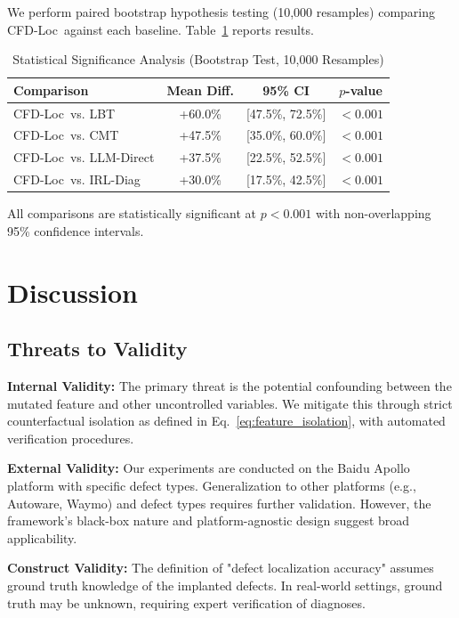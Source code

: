 \documentclass[conference]{IEEEtran}
\theoremstyle{plain}
\newcommand{\methodname}{CFD-Loc}
\begin{document}
We perform paired bootstrap hypothesis testing (10,000 resamples) comparing \methodname\ against each baseline. Table~\ref{tab:stats} reports results.

\begin{table}[h]
\centering
\caption{Statistical Significance Analysis (Bootstrap Test, 10,000 Resamples)}
\label{tab:stats}
\begin{tabular}{lccc}
\toprule
\textbf{Comparison} & \textbf{Mean Diff.} & \textbf{95\% CI} & \textbf{$p$-value} \\
\midrule
\methodname\ vs. LBT & +60.0\% & [47.5\%, 72.5\%] & $<0.001$ \\
\methodname\ vs. CMT & +47.5\% & [35.0\%, 60.0\%] & $<0.001$ \\
\methodname\ vs. LLM-Direct & +37.5\% & [22.5\%, 52.5\%] & $<0.001$ \\
\methodname\ vs. IRL-Diag & +30.0\% & [17.5\%, 42.5\%] & $<0.001$ \\
\bottomrule
\end{tabular}
\end{table}

All comparisons are statistically significant at $p < 0.001$ with non-overlapping 95\% confidence intervals.

\section{Discussion}
\label{sec:discussion}

\subsection{Threats to Validity}

\textbf{Internal Validity:} The primary threat is the potential confounding between the mutated feature and other uncontrolled variables. We mitigate this through strict counterfactual isolation as defined in Eq.~\ref{eq:feature_isolation}, with automated verification procedures.

\textbf{External Validity:} Our experiments are conducted on the Baidu Apollo platform with specific defect types. Generalization to other platforms (e.g., Autoware, Waymo) and defect types requires further validation. However, the framework's black-box nature and platform-agnostic design suggest broad applicability.

\textbf{Construct Validity:} The definition of "defect localization accuracy" assumes ground truth knowledge of the implanted defects. In real-world settings, ground truth may be unknown, requiring expert verification of diagnoses.
\end{document}
